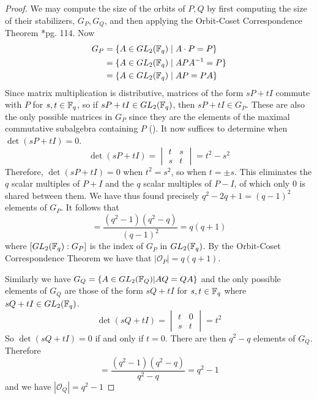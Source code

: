 \documentclass{amsart}
\begin{document}
\begin{proof}
    We may compute the size of the orbits of $P, Q$ by first computing the size of their stabilizers, $G_P, G_Q$, and then applying the Orbit-Coset Correspondence Theorem \cite{DandF}*{pg. 114}.
    Now
    \begin{align*}
        G_P &= \{A \in GL_2(\protect\mathbb{F}_q) \mid A \cdot P = P\} \\
            &= \{A \in GL_2(\protect\mathbb{F}_q) \mid APA^{-1} = P\} \\
            &= \{A \in GL_2(\protect\mathbb{F}_q) \mid AP = PA\} 
    \end{align*}
    Since matrix multiplication is distributive, matrices of the form $sP + tI$ commute with $P$ for $s,t \in \protect\mathbb{F}_q$, so if $sP + tI \in GL_2(\protect\mathbb{F}_q)$, then $sP + tI \in G_P$. These are also the only possible matrices in $G_P$ since they are the elements of the maximal commutative subalgebra containing $P$ (). It now suffices to determine when $\det(sP + tI) = 0$.
    \begin{equation*}
        \det(sP+tI) =
        \begin{vmatrix}
            t & s \\
            s & t
        \end{vmatrix} = t^2 - s^2
    \end{equation*}
    Therefore, $\det(sP + tI) = 0$ when $t^2 = s^2$, so when $t = \pm s$. This eliminates the $q$ scalar multiples of $P + I$ and the $q$ scalar multiples of $P - I$, of which only $0$ is shared between them. We have thus found precisely $q^2 - 2q + 1 = (q-1)^2$ elements of $G_P$. It follows that
    \begin{equation*}
        [GL_2(\bF_q) : G_P] = \frac{(q^2-1)(q^2-q)}{(q-1)^2} = q(q + 1)
    \end{equation*}
    where $[GL_2(\protect\mathbb{F}_q) : G_P]$ is the index of $G_P$ in $GL_2(\protect\mathbb{F}_q)$. By the Orbit-Coset Correspondence Theorem we have that $|\mathcal{O}_P| = q(q + 1)$.

    Similarly we have $G_Q = \{A \in GL_2(\protect\mathbb{F}_Q) | AQ = QA\}$ and the only possible elements of $G_Q$ are those of the form $sQ + tI$ for $s,t \in \protect\mathbb{F}_q$ where $sQ+tI \in GL_2(\protect\mathbb{F}_q)$.
    \begin{equation*}
        \det(sQ+tI) =
        \begin{vmatrix}
            t & 0 \\
            s & t
        \end{vmatrix} = t^2
    \end{equation*}
    So $\det(sQ + tI) = 0$ if and only if $t = 0$. There are then $q^2 - q$ elements of $G_Q$. Therefore
    \begin{equation*}
        [GL_2(\bF_q) : G_Q] = \frac{(q^2-1)(q^2-q)}{q^2 - q} = q^2 - 1
    \end{equation*}
    and we have $|\mathcal{O}_Q| = q^2 - 1$
\end{proof}
\end{document}
